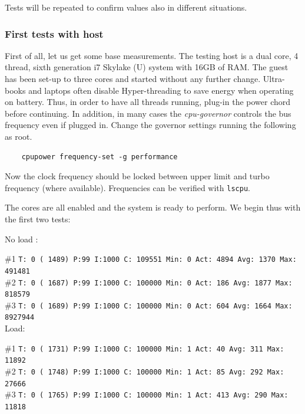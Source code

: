 \documentclass[]{scrartcl}
\begin{document}
Tests will be repeated to confirm values also in different situations.

\subsubsection{First tests with host}

First of all, let us get some base measurements. The testing host is a dual core, 4 thread, sixth generation i7 Skylake (U) system with 16GB of RAM. The guest has been set-up to three cores
and started without any further change. 
Ultra-books and laptops often disable Hyper-threading to save energy when operating on battery. Thus, in order to have all threads running, plug-in the power chord before continuing. %
In addition, in many cases the \textit{cpu-governor} controls the bus frequency even if plugged in. Change the governor settings running the following as root. 

\begin{verbatim}
	cpupower frequency-set -g performance
\end{verbatim}

Now the clock frequency should be locked between upper limit and turbo frequency (where available). Frequencies can be verified with \texttt{lscpu}. 

The cores are all enabled and the system is ready to perform.
We begin thus with the first two tests:

\bigskip

\noindent No load :

\noindent \small \#1 \texttt{T: 0 ( 1489) P:99 I:1000 C: 109551 Min: 0 Act: 4894 Avg: 1370 Max:  491481}\\
\noindent \small \#2 \texttt{T: 0 ( 1687) P:99 I:1000 C: 100000 Min: 0 Act:  186 Avg: 1877 Max:  818579}\\
\noindent \small \#3 \texttt{T: 0 ( 1689) P:99 I:1000 C: 100000 Min: 0 Act:  604 Avg: 1664 Max:  8927944}\\

\noindent Load:

\noindent \small \#1 \texttt{T: 0 ( 1731) P:99 I:1000 C: 100000 Min: 1 Act:   40 Avg:  311 Max:   11892}\\
\noindent \small \#2 \texttt{T: 0 ( 1748) P:99 I:1000 C: 100000 Min: 1 Act:   85 Avg:  292 Max:   27666}\\
\noindent \small \#3 \texttt{T: 0 ( 1765) P:99 I:1000 C: 100000 Min: 1 Act:  413 Avg:  290 Max:   11818}
\end{document}
